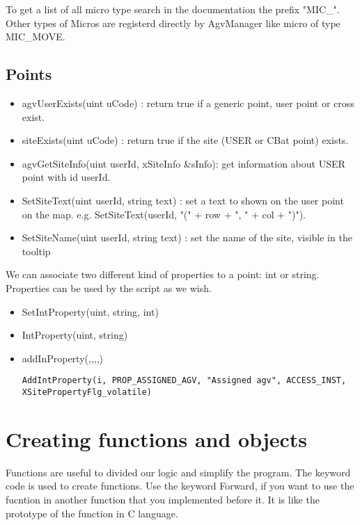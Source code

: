 To get a list of all micro type search in the documentation the prefix "{MIC\_}". Other types of Micros are registerd directly by AgvManager like micro of type MIC\_MOVE.

\subsection{Points}

\begin{itemize}
	\item agvUserExists(uint uCode) : return true if a generic point, user point or cross exist.
	\item siteExists(uint uCode) : return true if the site (USER or CBat point) exists.
	\item agvGetSiteInfo(uint userId, xSiteInfo \&sInfo): get information about USER point with id userId.
	\item SetSiteText(uint userId, string text) : set a text to shown on the user point on the map. e.g. SetSiteText(userId, "(" + row + ", " + col + ")").
	\item SetSiteName(uint userId, string text) : set the name of the site, visible in the tooltip\\
\end{itemize}

We can associate two different kind of properties to a point: int or string. Properties can be used by the script as we wish.
\begin{itemize}
	\item SetIntProperty(uint, string, int)
	\item IntProperty(uint, string)
	\item addInProperty(,,,,)
	\begin{lstlisting}[frame=none]
	AddIntProperty(i, PROP_ASSIGNED_AGV, "Assigned agv", ACCESS_INST, XSitePropertyFlg_volatile)
	\end{lstlisting}
\end{itemize}	

%
\section{Creating functions and objects}
Functions are useful to divided our logic and simplify the program. The keyword code is used to create functions.
Use the keyword Forward, if you want to use the fucntion in another function that you implemented before it. It is like the prototype of the function in C language.
 
